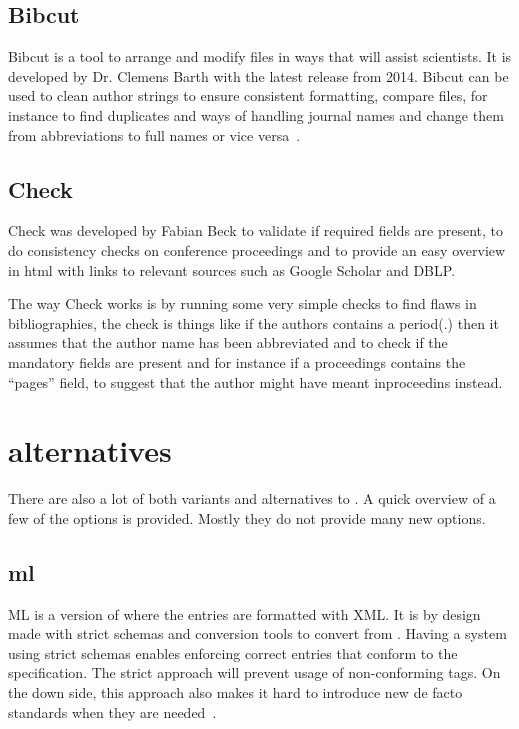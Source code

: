 \subsection{Bibcut}
Bibcut is a tool to arrange and modify {\bibtex} files in ways that
will assist scientists.  It is developed by Dr. Clemens Barth with the
latest release from 2014.  Bibcut can be used to clean author strings
to ensure consistent formatting, compare {\bibtex} files, for instance
to find duplicates and ways of handling journal names and change them
from abbreviations to full names or vice versa~\cite{bibcut_site}.

\subsection{{\bibtex} Check}
{\bibtex} Check was developed by Fabian Beck to validate if required
fields are present, to do consistency checks on conference proceedings
and to provide an easy overview in html with links to relevant sources
such as Google Scholar and DBLP.

The way {\bibtex} Check works is by running some very simple checks to
find flaws in bibliographies, the check is things like if the authors
contains a period(.) then it assumes that the author name has been
abbreviated and to check if the mandatory fields are present and for
instance if a proceedings contains the ``pages'' field, to suggest
that the author might have meant inproceedins instead.


\section{{\bibtex} alternatives}
\label{sec:bibtex_alternatives}
There are also a lot of both variants and alternatives to {\bibtex}.
A quick overview of a few of the options is provided.  Mostly they do
not provide many new options.

\subsection{{\bibtex}ml} {\bibtex}ML is a version of {\bibtex} where
the entries are formatted with XML.  It is by design made with strict
schemas and conversion tools to convert from {\bibtex}.  Having a
system using strict schemas enables enforcing correct entries that
conform to the specification.  The strict approach will prevent usage
of non-conforming tags.  On the down side, this approach also makes it
hard to introduce new de facto standards when they are
needed~\cite{gunhen2007_bibtexml}.

